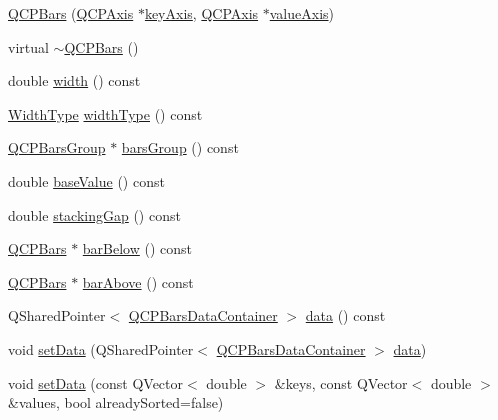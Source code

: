 \begin{DoxyCompactItemize}
\item 
\hyperlink{class_q_c_p_bars_a64006999ad9dff308f40df41cef176ad}{Q\+C\+P\+Bars} (\hyperlink{class_q_c_p_axis}{Q\+C\+P\+Axis} $\ast$\hyperlink{class_q_c_p_abstract_plottable_a72c7a09c22963f2c943f07112b311103}{key\+Axis}, \hyperlink{class_q_c_p_axis}{Q\+C\+P\+Axis} $\ast$\hyperlink{class_q_c_p_abstract_plottable_a3106f9d34d330a6097a8ec5905e5b519}{value\+Axis})
\item 
virtual \hyperlink{class_q_c_p_bars_a4d880e28031ef120603f543379be2f22}{$\sim$\+Q\+C\+P\+Bars} ()
\item 
double \hyperlink{class_q_c_p_bars_a42798c38abd5f5db22bd45d77f429625}{width} () const 
\item 
\hyperlink{class_q_c_p_bars_a65dbbf1ab41cbe993d71521096ed4649}{Width\+Type} \hyperlink{class_q_c_p_bars_a8606651ada5804075f6affd04c88dd05}{width\+Type} () const 
\item 
\hyperlink{class_q_c_p_bars_group}{Q\+C\+P\+Bars\+Group} $\ast$ \hyperlink{class_q_c_p_bars_a6d6b2b17619a0ba9c7a88bb2b90fc178}{bars\+Group} () const 
\item 
double \hyperlink{class_q_c_p_bars_a3c8686a74396883fd1da87b2e325b043}{base\+Value} () const 
\item 
double \hyperlink{class_q_c_p_bars_af2cdffc1a2adb784ec06a986691750cb}{stacking\+Gap} () const 
\item 
\hyperlink{class_q_c_p_bars}{Q\+C\+P\+Bars} $\ast$ \hyperlink{class_q_c_p_bars_a2c46a686cbad95f180ca3c2e88263961}{bar\+Below} () const 
\item 
\hyperlink{class_q_c_p_bars}{Q\+C\+P\+Bars} $\ast$ \hyperlink{class_q_c_p_bars_a9ca48a6577586825d85bdc1fbf410803}{bar\+Above} () const 
\item 
Q\+Shared\+Pointer$<$ \hyperlink{qcustomplot_8hh_a52bf589c9fce1baa36c1d40d69785d46}{Q\+C\+P\+Bars\+Data\+Container} $>$ \hyperlink{class_q_c_p_bars_afa75a82bb667d0300da551b47771ac5f}{data} () const 
\item 
void \hyperlink{class_q_c_p_bars_a6dc562ec7120a8521e1061f2134367e4}{set\+Data} (Q\+Shared\+Pointer$<$ \hyperlink{qcustomplot_8hh_a52bf589c9fce1baa36c1d40d69785d46}{Q\+C\+P\+Bars\+Data\+Container} $>$ \hyperlink{class_q_c_p_bars_afa75a82bb667d0300da551b47771ac5f}{data})
\item 
void \hyperlink{class_q_c_p_bars_a2a88cd5b16ec7b71e5a590f95b50c5ce}{set\+Data} (const Q\+Vector$<$ double $>$ \&keys, const Q\+Vector$<$ double $>$ \&values, bool already\+Sorted=false)

\end{DoxyCompactItemize}
